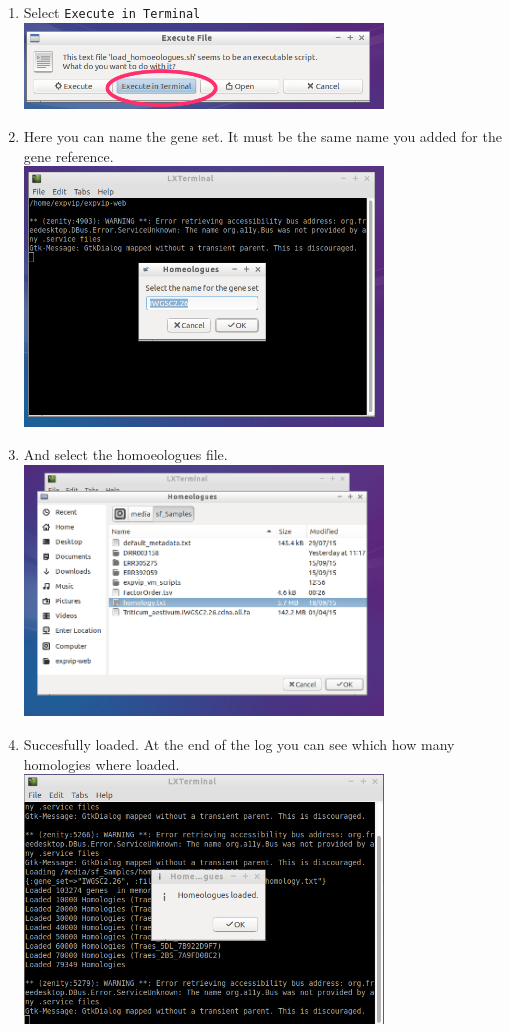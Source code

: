 \begin{enumerate}
\item
  Select \lstinline!Execute in Terminal!
  \\ \includegraphics[width=0.75\textwidth]{expVIP/tutorial/images/LoadHom02.png}
\item
  Here you can name the gene set. It must be the same name you added for
  the gene reference. \\ \includegraphics[width=0.75\textwidth]{expVIP/tutorial/images/LoadHom03.png}
\item
  And select the homoeologues file.
  \\ \includegraphics[width=0.75\textwidth]{expVIP/tutorial/images/LoadHom04.png}
\item
  Succesfully loaded. At the end of the log you can see which how many
  homologies where loaded. \\ \includegraphics[width=0.75\textwidth]{expVIP/tutorial/images/LoadHom05.png}
\end{enumerate}

